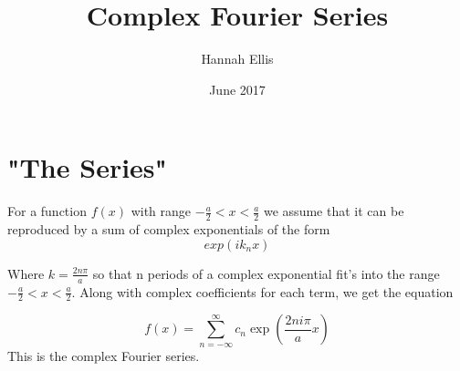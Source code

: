 \documentclass[11pt,twoside,a4paper]{article}
\begin{document}
\title{Complex Fourier Series}
\author{Hannah Ellis}
\date{June 2017}
\maketitle
\section{"The Series"}
For a function $f(x)$ with range $-\frac{a}{2}<x<\frac{a}{2}$ we assume that it can
be reproduced by a sum of complex exponentials of the form
\begin{equation}
exp(i k_n x)
\end{equation}

Where $k=\frac{2n\pi}{a}$ so that n periods of a complex exponential fit's into
the range $-\frac{a}{2}<x<\frac{a}{2}$. Along with complex coefficients for each
term, we get the equation

\begin{equation}
\label{eq:cfs}
f(x)=\sum_{n=-\infty}^{\infty} c_n \exp\left(\frac{2ni\pi}{a}x\right)
\end{equation}
This is the complex Fourier series.
\end{document}

